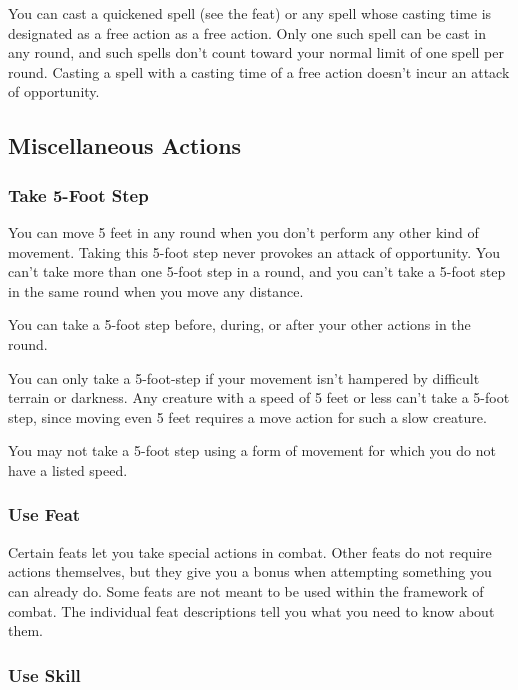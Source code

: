 You can cast a quickened spell (see the  feat) or any spell whose 
casting time is designated as a free action as a free action. Only one such spell 
can be cast in any round, and such spells don't count toward your normal limit 
of one spell per round. Casting a spell with a casting time of a free action doesn't 
incur an attack of opportunity.

\subsection{Miscellaneous Actions}

\subsubsection{Take 5-Foot Step}

You can move 5 feet in any round when you don't perform any other kind of movement. 
Taking this 5-foot step never provokes an attack of opportunity. You can't take 
more than one 5-foot step in a round, and you can't take a 5-foot step in the same 
round when you move any distance.

You can take a 5-foot step before, during, or after your other actions in the round. 

You can only take a 5-foot-step if your movement isn't hampered by difficult terrain 
or darkness. Any creature with a speed of 5 feet or less can't take a 5-foot step, 
since moving even 5 feet requires a move action for such a slow creature.

You may not take a 5-foot step using a form of movement for which you do not have 
a listed speed. 

\subsubsection{Use Feat}

Certain feats let you take special actions in combat. Other feats do not require 
actions themselves, but they give you a bonus when attempting something you can 
already do. Some feats are not meant to be used within the framework of combat. 
The individual feat descriptions tell you what you need to know about them.

\subsubsection{Use Skill}

